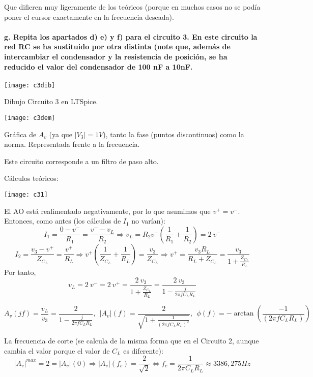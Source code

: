 \documentclass{article}
\begin{document}
Que difieren muy ligeramente de los teóricos (porque en muchos casos no se podía poner el cursor exactamente en la frecuencia deseada).

\paragraph{g. Repita los apartados d) e) y f) para el circuito 3. En este circuito la red RC se ha sustituido por otra distinta (note que, además de intercambiar el condensador y la resistencia de posición, se ha reducido el valor del condensador de 100 nF a 10nF.}

\begin{center}
\centerline{\texttt{[image: c3dib]}}

Dibujo Circuito 3 en LTSpice.
\end{center}
\begin{center}
\centerline{\texttt{[image: c3dem]}}

Gráfica de $A_v$ (ya que $|V_3|=1V$), tanto la fase (puntos discontinuos) como la norma. Representada frente a la frecuencia.
\end{center}

Este circuito corresponde a un filtro de paso alto.
    
Cálculos teóricos:

\centerline{\texttt{[image: c31]}}

El AO está realimentado negativamente, por lo que asumimos que $v^+=v^-$. Entonces, como antes (los cálculos de $I_1$ no varían):
$$I_1=\frac{0-v^-}{R_1}=\frac{v^--v_{L}}{R_2}\Rightarrow v_L=R_2 v^- \left( \frac{1}{R_1}+\frac{1}{R_2}\right)=2\ v^-$$
$$I_2=\frac{v_3-v^+}{Z_{C_L}}=\frac{v^+}{R_L}\Rightarrow v^+\left(\frac{1}{Z_{C_L}}+\frac{1}{R_L}\right)=\frac{v_3}{Z_{C_L}}\Rightarrow v^+=\frac{v_3 R_L}{R_L+Z_{C_L}}=\frac{v_3}{1+\frac{Z_{C_L}}{R_L}}$$
Por tanto,
$$v_L=2\ v^-=2\ v^+=\frac{2\ v_3}{1+\frac{Z_{C_L}}{R_L}}=\frac{2\ v_3}{1-\frac{j}{2\pi f C_L R_L}}$$

$$A_v(jf)=\frac{v_L}{v_3}=\frac{2}{1-\frac{j}{2\pi f C_L R_L}}, \ \ |A_v|(f)=\frac{2}{\sqrt{1+\frac{1}{(2\pi f C_L R_L)^2}}}, \ \ \phi(f)=-\arctan{\left(\frac{-1}{(2\pi f C_L R_L)}\right)}$$

La frecuencia de corte (se calcula de la misma forma que en el Circuito 2, aunque cambia el valor porque el valor de $C_L$ es diferente):
$$|A_v|^{max}=2=|A_v|(0)\Rightarrow |A_v|(f_c)=\frac{2}{\sqrt2}\iff f_c=\frac{1}{2\pi C_L R_L}\approx 3386,275 Hz$$
\end{document}
